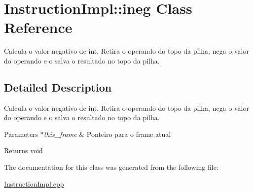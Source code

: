 \hypertarget{class_instruction_impl_1_1ineg}{}\section{Instruction\+Impl\+:\+:ineg Class Reference}
\label{class_instruction_impl_1_1ineg}


Calcula o valor negativo de int. Retira o operando do topo da pilha, nega o valor do operando e o salva o resultado no topo da pilha.  




\subsection{Detailed Description}
Calcula o valor negativo de int. Retira o operando do topo da pilha, nega o valor do operando e o salva o resultado no topo da pilha. 


\begin{DoxyParams}{Parameters}
{\em $\ast$this\+\_\+frame} & Ponteiro para o frame atual \\
\hline
\end{DoxyParams}
\begin{DoxyReturn}{Returns}
void 
\end{DoxyReturn}


The documentation for this class was generated from the following file\+:\begin{DoxyCompactItemize}
\item 
\hyperlink{_instruction_impl_8cpp}{Instruction\+Impl.\+cpp}\end{DoxyCompactItemize}
